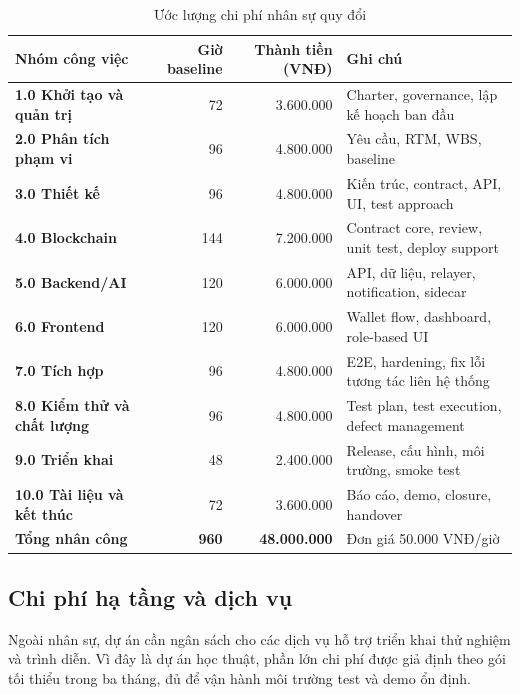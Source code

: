 \begin{table}[H]
\centering
\caption{Ước lượng chi phí nhân sự quy đổi}
\label{tab:labor-cost-estimate}
\begin{tabularx}{\textwidth}{| >{\bfseries}p{4.8cm} | r | r | X |}
\hline
Nhóm công việc & Giờ baseline & Thành tiền (VNĐ) & Ghi chú \\
\hline
1.0 Khởi tạo và quản trị & 72 & 3.600.000 & Charter, governance, lập kế hoạch ban đầu \\ \hline
2.0 Phân tích phạm vi & 96 & 4.800.000 & Yêu cầu, RTM, WBS, baseline \\ \hline
3.0 Thiết kế & 96 & 4.800.000 & Kiến trúc, contract, API, UI, test approach \\ \hline
4.0 Blockchain & 144 & 7.200.000 & Contract core, review, unit test, deploy support \\ \hline
5.0 Backend/AI & 120 & 6.000.000 & API, dữ liệu, relayer, notification, sidecar \\ \hline
6.0 Frontend & 120 & 6.000.000 & Wallet flow, dashboard, role-based UI \\ \hline
7.0 Tích hợp & 96 & 4.800.000 & E2E, hardening, fix lỗi tương tác liên hệ thống \\ \hline
8.0 Kiểm thử và chất lượng & 96 & 4.800.000 & Test plan, test execution, defect management \\ \hline
9.0 Triển khai & 48 & 2.400.000 & Release, cấu hình, môi trường, smoke test \\ \hline
10.0 Tài liệu và kết thúc & 72 & 3.600.000 & Báo cáo, demo, closure, handover \\
\hline
\textbf{Tổng nhân công} & \textbf{960} & \textbf{48.000.000} & Đơn giá 50.000 VNĐ/giờ \\
\hline
\end{tabularx}
\end{table}

\subsection{Chi phí hạ tầng và dịch vụ}

Ngoài nhân sự, dự án cần ngân sách cho các dịch vụ hỗ trợ triển khai thử nghiệm và trình diễn. Vì đây là dự án học thuật, phần lớn chi phí được giả định theo gói tối thiểu trong ba tháng, đủ để vận hành môi trường test và demo ổn định.

